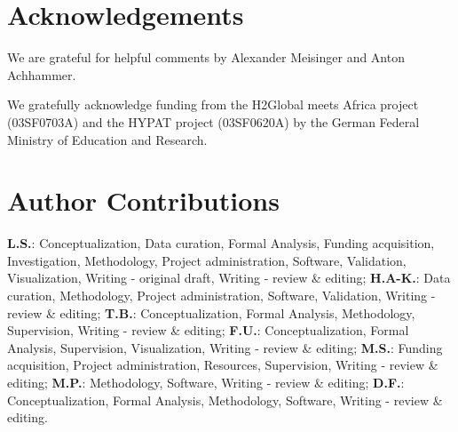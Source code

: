 \documentclass[5p,numafflabel]{elsarticle}
\begin{document}
\renewcommand{\ttdefault}{\sfdefault}



\section*{Acknowledgements}

We are grateful for helpful comments by Alexander Meisinger and Anton Achhammer.

We gratefully acknowledge funding from the H2Global meets Africa project (03SF0703A) and the HYPAT project (03SF0620A) by the German Federal Ministry of Education and Research.



\section*{Author Contributions}


\textbf{L.S.}:
Conceptualization,
Data curation,
Formal Analysis,
Funding acquisition,
Investigation,
Methodology,
Project administration,
Software,
Validation,
Visualization,
Writing - original draft,
Writing - review \& editing;
\textbf{H.A-K.}:
Data curation,
Methodology,
Project administration,
Software,
Validation,
Writing - review \& editing;
\textbf{T.B.}:
Conceptualization,
Formal Analysis,
Methodology,
Supervision,
Writing - review \& editing;
\textbf{F.U.}:
Conceptualization,
Formal Analysis,
Supervision,
Visualization,
Writing - review \& editing;
\textbf{M.S.}:
Funding acquisition,
Project administration,
Resources,
Supervision,
Writing - review \& editing;
\textbf{M.P.}:
Methodology,
Software,
Writing - review \& editing;
\textbf{D.F.}:
Conceptualization,
Formal Analysis,
Methodology,
Software,
Writing - review \& editing.
\end{document}
